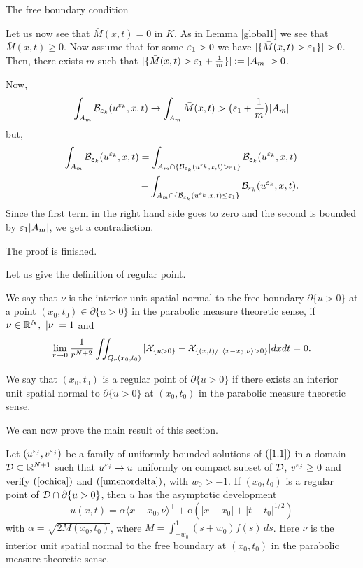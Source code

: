 \begin{section}{The free boundary condition}
\begin{pf}
Let us now see that $\bar M(x,t)=0$ in $K$. As in Lemma \ref{global1} we see that
$\bar M(x,t)\ge0$. Now assume that for some $\varepsilon_1>0$ we have $|\{\bar M(x,t)>\ve_1\}|>0$.
Then, there exists $m$ such that $|\{\bar M(x,t)>\ve_1+\frac1m\}|:=|A_m|>0$.

Now,
$$
\int_{A_m}{\cal B}_{{\varepsilon_k}}(u^{\varepsilon_k},x,t)\to\int_{A_m}\bar M(x,t)>\big(\varepsilon_1+\frac1m\big)|A_m|
$$
but,
\begin{align*}
\int_{A_m}{\cal B}_{{\varepsilon_k}}(u^{\varepsilon_k},x,t)&
=\int_{A_m\cap\{{\cal B}_{{\varepsilon_k}}(u^{\varepsilon_k},x,t)>\varepsilon_1\}}{\cal B}_{{\varepsilon_k}}(u^{\varepsilon_k},x,t)\\
&+\int_{A_m\cap\{{\cal B}_{{\varepsilon_k}}(u^{\varepsilon_k},x,t)\le \varepsilon_1\}}{\cal B}_{{\varepsilon_k}}(u^{\varepsilon_k},x,t).
\end{align*}
Since the first term in the right hand side goes to zero and the second is
bounded by $\varepsilon_1|A_m|$, we get a contradiction.

The proof is finished.
\end{pf}

Let us give the definition of regular point.

\begin{defi}
\label{def1}
We say that $\nu$ is the interior unit spatial normal to the free boundary 
$\partial\{ u>0 \}$ at a point $(x_0,t_0)\in\partial\{ u>0 \}$ in the 
parabolic measure theoretic sense, if $\nu\in {\Bbb R}^N,\ |\nu|=1$ and
$$\lim_{r\to 0}\frac{1}{r^{N+2}}\iint_{Q_r(x_0,t_0)}
|{\cal X}_{\{ u>0 \}}-{\cal X}_{\{ (x,t)/\ \langle x-x_0,\nu \rangle>0\}}| dxdt=0.$$
\end{defi}

\begin{defi}
\label{def2}
We say that $(x_0,t_0)$ is a regular point of $\partial\{ u>0 \}$ if there 
exists an interior unit spatial normal to $\partial\{ u>0 \}$ at $(x_0,t_0)$ in 
the parabolic measure theoretic sense.
\end{defi}

We can  now prove the main result of this section.



\begin{teo}
\label{puntual}
Let $(u^{\varepsilon_j},v^{\varepsilon_j})$ be a family of uniformly bounded solutions of $(\ref{1.1})$ in a domain
${\cal D}\subset {\Bbb R}^{N+1}$ such that $u^{\varepsilon_j}\to u$ uniformly on 
compact subset of ${\cal D}$, $v^{\varepsilon_j}\ge0$ and verify $(\ref{ochica})$
and $(\ref{umenordelta})$, with $w_0>-1$.  If $(x_0,t_0)$ is 
a regular point of ${\cal D}\cap\partial\{ u>0 \}$, then  
$u$ has the asymptotic development
$$u(x,t) = \alpha\langle x-x_0,\nu \rangle^+ + 
\mbox{o}(|x-x_0|+|t-t_0|^{1/2})$$
with $\alpha = \sqrt{2M(x_0,t_0)}$, where $M=\int_{-w_0}^1 (s+w_0)f(s)\,ds$.
Here $\nu$ is the interior unit 
spatial normal
to the free boundary at $(x_0,t_0)$ in the parabolic measure theoretic sense.
\end{teo}


\end{section}
